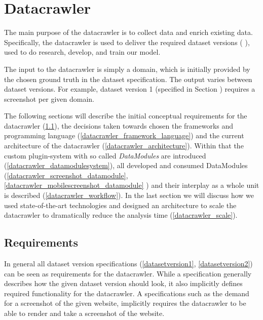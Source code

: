 \section{Datacrawler}
\label{Datacrawler}
The main purpose of the datacrawler is to collect data and enrich existing data. Specifically, the datacrawler is used to deliver the required dataset versions (\label{dataset} ), used to do research, develop, and train our model.

The input to the datacrawler is simply a domain, which is initially provided by the chosen ground truth in the dataset specification. The output varies between dataset versions. For example, dataset version 1 (specified in Section \label{datasetversion1})  requires a screenshot per given domain.

The following sections will describe the initial conceptual requirements for the datacrawler (\ref{datacrawler_requirements}), the decisions taken towards chosen the frameworks and programming language (\ref{datacrawler_framework_language}) and the current architecture of the datacrawler (\ref{datacrawler_architecture}). Within that the custom plugin-system with so called \textit{DataModules} are introduced (\ref{datacrawler_datamodulesystem}), all developed and consumed DataModules (\ref{datacrawler_screenshot_datamodule}, \ref{datacrawler_mobilescreenshot_datamodule} ) and their interplay as a whole unit is described (\ref{datacrawler_workflow}).  In the last section we will discuss how we used state-of-the-art technologies and designed an architecture to scale the datacrawler to dramatically reduce the analysis time (\ref{datacrawler_scale}).

\subsection{Requirements}
\label{datacrawler_requirements}
In general all dataset version specifications (\ref{datasetversion1}, \ref{datasetversion2}) can be seen as requirements for the datacrawler. While a specification generally describes how the given dataset version should look, it also implicitly defines required functionality for the datacrawler. A specifications such as the demand for a screenshot of the given website, implicitly requires the datacrawler to be able to render and take a screenshot of the website.

